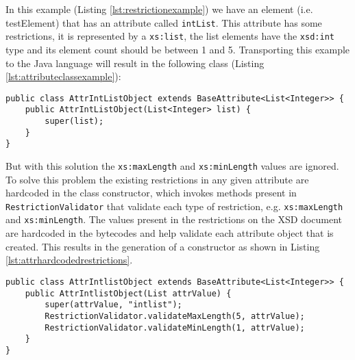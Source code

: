 \noindent
In this example (Listing \ref{lst:restrictionexample}) we have an element (i.e. testElement) that has an attribute called \texttt{intList}. This attribute has some restrictions, it is represented by a \texttt{xs:list}, the list elements have the \texttt{xsd:int} type and its element count should be between 1 and 5. Transporting this example to the Java language will result in the following class (Listing \ref{lst:attributeclassexample}):


\begin{minipage}{\linewidth}
\begin{lstlisting}[caption={Attribute Class Example},captionpos=b,label={lst:attributeclassexample}]
public class AttrIntListObject extends BaseAttribute<List<Integer>> {
    public AttrIntListObject(List<Integer> list) {
        super(list);
    }
}
\end{lstlisting}
\end{minipage}

\noindent
But with this solution the \texttt{xs:maxLength} and \texttt{xs:minLength} values are ignored. To solve this problem the existing restrictions in any given attribute are hardcoded in the class constructor, which invokes methods present in \texttt{RestrictionValidator} that validate each type of restriction, e.g. \texttt{xs:maxLength} and \texttt{xs:minLength}. The values present in the restrictions on the \ac{XSD} document are hardcoded in the bytecodes and help validate each attribute object that is created. This results in the generation of a constructor as shown in Listing \ref{lst:attrhardcodedrestrictions}.

\bigskip


\begin{minipage}{\linewidth}
\begin{lstlisting}[caption={Attribute Static Constructor Restrictions},captionpos=b,label={lst:attrhardcodedrestrictions}]
public class AttrIntlistObject extends BaseAttribute<List<Integer>> {
    public AttrIntlistObject(List attrValue) {
        super(attrValue, "intlist");
        RestrictionValidator.validateMaxLength(5, attrValue);
        RestrictionValidator.validateMinLength(1, attrValue);
    }
}

\end{lstlisting}
\end{minipage}

